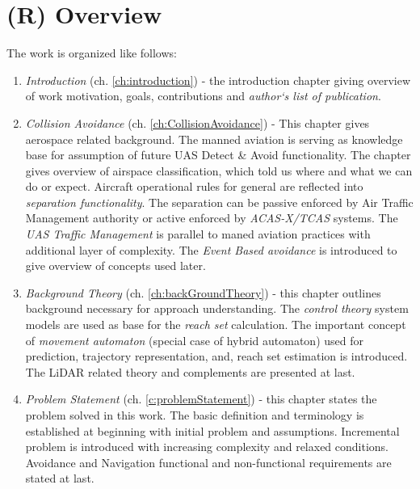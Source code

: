 \setcounter{chapter}{1}
\setcounter{section}{3}
\setcounter{subsection}{0}
\section{(R) Overview}\label{s:Overview}

\noindent The work is organized like follows:

\begin{enumerate}
    \item \emph{Introduction} (ch. \ref{ch:introduction}) - the introduction chapter giving overview of work motivation, goals, contributions and \emph{author`s list of publication}.
    
    \item \emph{Collision Avoidance} (ch. \ref{ch:CollisionAvoidance}) - This chapter gives aerospace related background. The manned aviation is serving as knowledge base for assumption of future UAS Detect \& Avoid functionality. The chapter gives overview of airspace classification, which told us where and what we can do or expect. Aircraft operational rules for general are reflected into \emph{separation functionality}. The separation can be passive enforced by Air Traffic Management authority or active enforced by \emph{ACAS-X/TCAS} systems. The \emph{UAS Traffic Management} is parallel to maned aviation practices with additional layer of complexity.  The \emph{Event Based avoidance} is introduced to give overview of concepts used later.
    
    \item \emph{Background Theory} (ch. \ref{ch:backGroundTheory}) - this chapter outlines background necessary for approach understanding. The \emph{control theory} system models are used as base for the \emph{reach set} calculation. The important concept of \emph{movement automaton} (special case of hybrid automaton) used for prediction, trajectory representation, and, reach set estimation is introduced. The LiDAR related theory and complements are presented at last. 
    
    \item \emph{Problem Statement} (ch. \ref{c:problemStatement}) - this chapter states the problem solved in this work. The basic definition and terminology is established at beginning with initial problem and assumptions. Incremental problem is introduced with increasing complexity and relaxed conditions. Avoidance and Navigation functional and non-functional requirements are stated at last. 
    

\end{enumerate}
